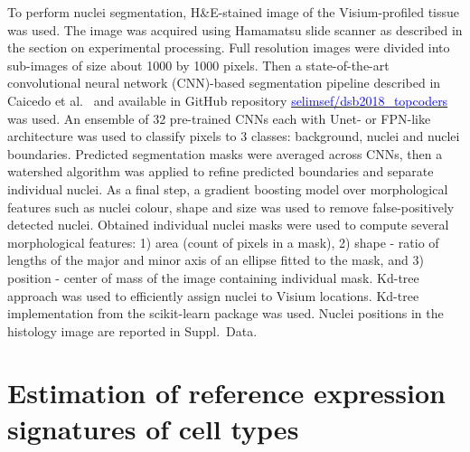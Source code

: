 \documentclass[11pt,a4paper]{article}
\newcommand{\blue}{\textcolor{blue}}
\begin{document}
To perform nuclei segmentation, H\&E-stained image of the Visium-profiled tissue was used. The image was acquired using Hamamatsu slide scanner as described in the section on experimental processing. Full resolution images were divided into sub-images of size about 1000 by 1000 pixels. Then a state-of-the-art convolutional neural network (CNN)-based segmentation pipeline described in Caicedo et al.~\autocite{caicedo_nucleus_2019} and available in GitHub repository \href{https://github.com/selimsef/dsb2018_topcoders}{\blue{selimsef/dsb2018\_topcoders}} was used. An ensemble of 32 pre-trained CNNs each with Unet- or FPN-like architecture was used to classify pixels to 3 classes: background, nuclei and nuclei boundaries. Predicted segmentation masks were averaged across CNNs, then a watershed algorithm was applied to refine predicted boundaries and separate individual nuclei. As a final step, a gradient boosting model over morphological features such as nuclei colour, shape and size was used to remove false-positively detected nuclei.  
Obtained individual nuclei masks were used to compute several morphological features: 1) area (count of pixels in a mask), 2) shape - ratio of lengths of the major and minor axis of an ellipse fitted to the mask, and 3) position - center of mass of the image containing individual mask.
Kd-tree approach was used to efficiently assign nuclei to Visium locations. Kd-tree implementation from the scikit-learn package was used. Nuclei positions in the histology image are reported in Suppl.~Data.

\section{Estimation of reference expression signatures of cell types} \label{c2l_ref_prog}
\end{document}
